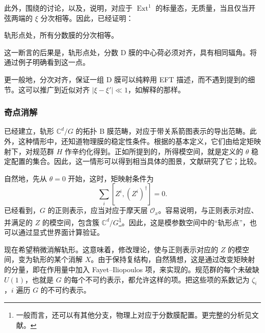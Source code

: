 此外，围绕的讨论，以及，说明，对应于 $\operatorname{Ext}^1$ 的标量态，无质量，当且仅当开弦两端的 $\xi$ 分次相等。因此，已经证明：
\begin{claim}\label{claim:5.27}
轨形点处，所有分数膜的分次相等。
\end{claim}

这一断言的后果是，轨形点处，分数 D 膜的中心荷必须对齐，具有相同辐角。将通过例子明确看到这一点。

更一般地，分次对齐，保证一组 D 膜可以纯粹用 EFT 描述，而不遇到提到的细节。这可以推广到近似对齐 $|\xi-\xi'|\ll1$，如解释的那样。

\subsubsection{奇点消解}\label{sec:5.4.5.3}

已经建立，轨形 $\mathbb{C}^d/G$ 的拓扑 B 膜范畴，对应于带关系箭图表示的导出范畴。此外，这种情形中，还知道物理膜的稳定性条件。根据的基本定义，它们由给定矩映射下，对规范群 $H$ 作辛约化得到。正如所提到的，所得模空间，就是定义的 $\theta$ 稳定配置的集合。因此，这一情形可以得到相当具体的图景，文献研究了它；比较。

自然地，先从 $\theta=0$ 开始，这时，矩映射条件为
\begin{equation}\label{eq:5.107}
\sum_i[Z^i,(Z^i)^\dagger]=0.
\end{equation}
已经看到，$G$ 的正则表示，应当对应于摩天层 $\mathcal{O}_x$。容易说明，与正则表示对应、并满足的 $Z$ 的模空间，包含簇 $\mathbb{C}^d/G$\footnote{一般而言，还可以有其他分支，物理上对应于分数膜配置。更完整的分析见文献。}。因此，这是模参数空间中的“轨形点”，也可以通过显式世界面计算验证。

现在希望稍微消解轨形。这意味着，修改理论，使与正则表示对应的 $Z$ 的模空间，变为轨形的某个消解 $X$。由于保持复结构，自然猜想，这是通过改变矩映射的分量，即在作用量中加入 Fayet--Iliopoulos 项，来实现的。规范群的每个未破缺 $U(1)$，也就是 $G$ 的每个不可约表示，都允许这样的项。把这些项的系数记为 $\zeta_i$，$i$ 遍历 $G$ 的不可约表示。

